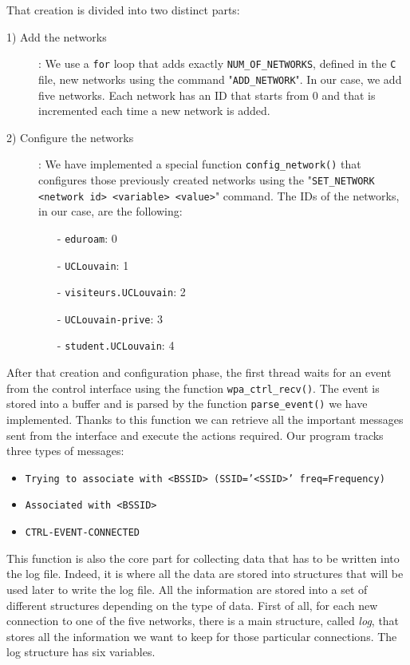 That creation is divided into two distinct parts:
\begin{description}
	\item [1) Add the networks]: We use a \texttt{for} loop that adds exactly \texttt{NUM\_OF\_NETWORKS}, defined in the \texttt{C} file, new networks using the command "\texttt{ADD\_NETWORK}". In our case, we add five networks. Each network has an ID that starts from 0 and that is incremented each time a new network is added.
	\item [2) Configure the networks]: We have implemented a special function \texttt{config\_network()} that configures those previously created networks using the "\texttt{SET\_NETWORK <network id> <variable> <value>}" command. The IDs of the networks, in our case, are the following:
		\begin{itemize}
			\item [-] \texttt{eduroam}: 0
			\item [-] \texttt{UCLouvain}: 1
			\item [-] \texttt{visiteurs.UCLouvain}: 2
			\item [-] \texttt{UCLouvain-prive}: 3
			\item [-] \texttt{student.UCLouvain}: 4
		\end{itemize}
\end{description}

After that creation and configuration phase, the first thread waits for an event from the control interface using the function \texttt{wpa\_ctrl\_recv()}. The event is stored into a buffer and is parsed by the function \texttt{parse\_event()} we have implemented. Thanks to this function we can retrieve all the important messages sent from the interface and execute the actions required. Our program tracks three types of messages:
\begin{itemize}
	\item \texttt{Trying to associate with <BSSID> (SSID='<SSID>' freq=Frequency)}
	\item \texttt{Associated with <BSSID>}
	\item \texttt{CTRL-EVENT-CONNECTED}
\end{itemize}

This function is also the core part for collecting data that has to be written into the log file. Indeed, it is where all the data are stored into structures that will be used later to write the log file. All the information are stored into a set of different structures depending on the type of data. First of all, for each new connection to one of the five networks, there is a main structure, called \textit{log}, that stores all the information we want to keep for those particular connections. The log structure has six variables.\\

